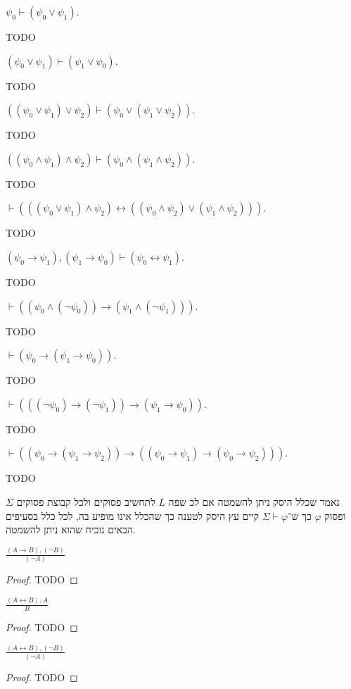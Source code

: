 \subquestion{}
$\psi_0 \vdash (\psi_0 \lor \psi_1)$.
\begin{solution}
	TODO
\end{solution}

\subquestion{}
$(\psi_0 \lor \psi_1) \vdash (\psi_1 \lor \psi_0)$.
\begin{solution}
	TODO
\end{solution}

\subquestion{}
$((\psi_0 \lor \psi_1) \lor \psi_2) \vdash (\psi_0 \lor (\psi_1 \lor \psi_2))$.
\begin{solution}
	TODO
\end{solution}

\subquestion{}
$((\psi_0 \land \psi_1) \land \psi_2) \vdash (\psi_0 \land (\psi_1 \land \psi_2))$.
\begin{solution}
	TODO
\end{solution}

\subquestion{}
$\vdash (((\psi_0 \lor \psi_1) \land \psi_2) \leftrightarrow ((\psi_0 \land \psi_2) \lor (\psi_1 \land \psi_2)))$.
\begin{solution}
	TODO
\end{solution}

\subquestion{}
$(\psi_0 \to \psi_1), (\psi_1 \to \psi_0) \vdash (\psi_0 \leftrightarrow \psi_1)$.
\begin{solution}
	TODO
\end{solution}

\subquestion{}
$\vdash ((\psi_0 \land (\lnot \psi_0)) \to (\psi_1 \land (\lnot \psi_1)))$.
\begin{solution}
	TODO
\end{solution}

\subquestion{}
$\vdash (\psi_0 \to (\psi_1 \to \psi_0))$.
\begin{solution}
	TODO
\end{solution}

\subquestion{}
$\vdash (((\lnot \psi_0) \to (\lnot \psi_1)) \to (\psi_1 \to \psi_0))$.
\begin{solution}
	TODO
\end{solution}

\subquestion{}
$\vdash ((\psi_0 \to (\psi_1 \to \psi_2)) \to ((\psi_0 \to \psi_1) \to (\psi_0 \to \psi_2)))$.
\begin{solution}
	TODO
\end{solution}

\question{}
נאמר שכלל היסק ניתן להשמטה אם לכ שפה $L$ לתחשיב פסוקים ולכל קבוצת פסוקים $\Sigma$ ופסוק $\varphi$ כך ש־$\Sigma \vdash \varphi$ קיים עץ היסק לטענה כך שהכלל אינו מופיע בה, לכל כלל בסעיפים הבאים נוכיח שהוא ניתן להשמטה.

\subquestion{}
$\frac{(A \to B), (\lnot B)}{(\lnot A)}$
\begin{proof}
	TODO
\end{proof}

\subquestion{}
$\frac{(A \leftrightarrow B), A}{B}$
\begin{proof}
	TODO
\end{proof}

\subquestion{}
$\frac{(A \leftrightarrow B), (\lnot B)}{(\lnot A)}$
\begin{proof}
	TODO
\end{proof}


